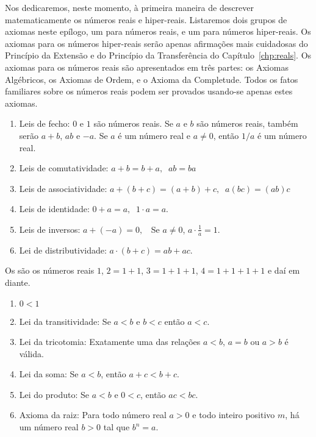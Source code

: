 \documentclass{svmono}
\begin{document}
Nos dedicaremos, neste momento, à primeira maneira de descrever
matematicamente os números reais e hiper-reais. Listaremos dois grupos
de axiomas neste epílogo, um para números reais, e um para números
hiper-reais. Os axiomas para os números hiper-reais serão apenas
afirmações mais cuidadosas do Princípio da Extensão e do Princípio
da Transferência do Capítulo~\ref{chp:reals}. Os axiomas para os
números reais são apresentados em três partes: os Axiomas Algébricos, os
Axiomas de Ordem, e o Axioma da Completude. Todos os fatos familiares
sobre os números reais podem ser provados usando-se apenas estes
axiomas.


\begin{enumerate}[A]
\item Leis de fecho: $0$ e $1$ são números reais. Se $a$ e $b$ são
      números reais, também serão $a+b$, $ab$ e $-a$. Se $a$ é um
      número real e $a \ne 0$, então $1/a$ é um número real.
\item Leis de comutatividade: $a+b = b + a, \; \; ab = ba$
\item Leis de associatividade: $a+(b+c) = (a+b) + c, \; \; a(bc) = (ab)c$
\item Leis de identidade: $0 + a = a, \; \; 1 \cdot a = a.$
\item Leis de inversos: $a+(-a) = 0, \; \;$ Se $a \ne 0$, $a \cdot \frac{1}{a} = 1.$
\item Lei de distributividade: $a \cdot (b+c) = ab + ac.$
\end{enumerate}

\begin{defin}
Os  são os números reais $1$, $2 = 1+1$,
$3 = 1+1+1$, $4 = 1+1+1+1$ e daí em diante.
\end{defin}


\begin{enumerate}[A]
\item $0 < 1$
\item Lei da transitividade: Se $a < b$ e $b < c$ então $a < c$.
\item Lei da tricotomia: Exatamente uma das relações $a < b$, $a = b$ ou $a > b$ é válida.
\item Lei da soma: Se $a < b$, então $a + c < b + c$.
\item Lei do produto: Se $a < b$ e $0 < c$, então $ac < bc$.
\item Axioma da raiz: Para todo número real $a > 0$ e todo inteiro positivo
      $m$, há um número real $b > 0$ tal que $b^n = a$.
\end{enumerate}
\end{document}
